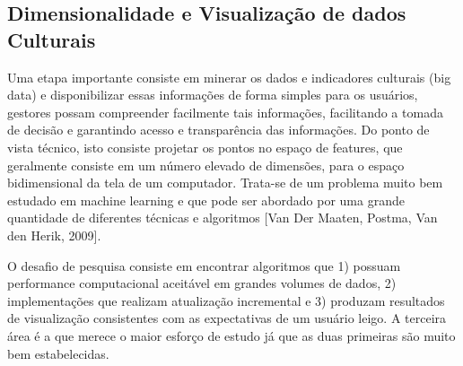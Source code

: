 \subsection{Dimensionalidade e Visualização de dados Culturais}
Uma etapa importante consiste em minerar os dados e indicadores culturais (big data) e disponibilizar essas informações 
 de forma simples para os usuários, gestores possam  compreender facilmente tais informações, facilitando a tomada de decisão e garantindo 
 acesso e transparência das informações. Do ponto de vista técnico, isto consiste projetar 
os pontos no espaço de features, que geralmente consiste em um número elevado de dimensões,  para o espaço 
bidimensional da tela de um computador. Trata-se de um problema muito bem estudado em machine learning  e que pode ser
abordado por uma grande quantidade de diferentes técnicas e algoritmos [Van Der Maaten, Postma, Van den Herik, 2009].

O desafio de pesquisa consiste em encontrar algoritmos que 1) possuam performance computacional aceitável em grandes volumes de dados, 2)
implementações que realizam atualização incremental e 3) produzam resultados de visualização consistentes com as expectativas de um usuário
leigo. A terceira área é a que merece o maior esforço de estudo já que as duas primeiras são muito bem estabelecidas. 


